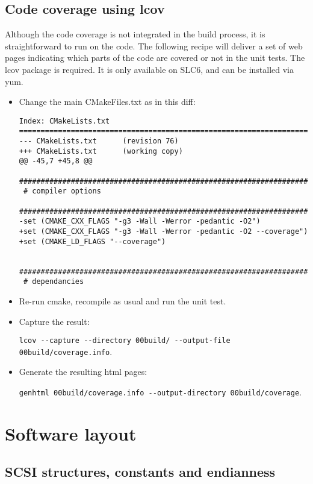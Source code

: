 \subsection{Code coverage using lcov}
Although the code coverage is not integrated in the build process, it is
straightforward to run on the code. The following recipe will deliver a set of 
web pages indicating which parts of the code are covered or not in the unit tests.
The lcov package is required. It is only available on SLC6, and can be installed via yum.
\begin{itemize}
\item{}Change the main CMakeFiles.txt as in this diff:
\begin{small}
\begin{verbatim}
Index: CMakeLists.txt
===================================================================
--- CMakeLists.txt      (revision 76)
+++ CMakeLists.txt      (working copy)
@@ -45,7 +45,8 @@
 ###########################################################################
 # compiler options
 ###########################################################################
-set (CMAKE_CXX_FLAGS "-g3 -Wall -Werror -pedantic -O2")
+set (CMAKE_CXX_FLAGS "-g3 -Wall -Werror -pedantic -O2 --coverage")
+set (CMAKE_LD_FLAGS "--coverage")

 ###########################################################################
 # dependancies
\end{verbatim}
\end{small}

\item{}Re-run cmake, recompile as usual and run the unit test.
\item{}Capture the result:

        \small{}\verb#lcov --capture --directory 00build/ --output-file 00build/coverage.info#.
\item{}\normalsize{}Generate the resulting html pages: 
        
        \small{}\verb#genhtml 00build/coverage.info --output-directory 00build/coverage#.
\end{itemize}

\section{Software layout}

\subsection{SCSI structures, constants and endianness}

